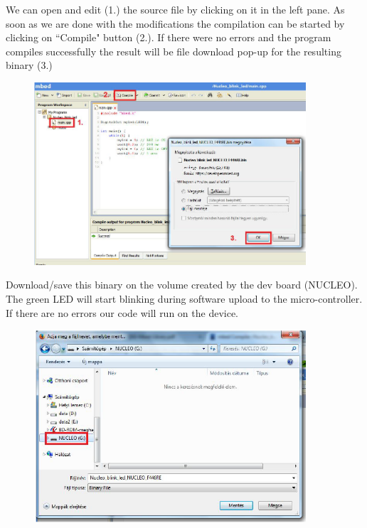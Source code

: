 \documentclass[a4paper]{article}
\begin{document}
We can open and edit (1.) the source file by clicking on it in the left pane. As soon as we are done with the
modifications the compilation can be started by clicking on ``Compile" button (2.). If there were no errors and the
program compiles successfully the result will be file download pop-up for the resulting binary (3.)

\begin{figure}[H]
    \centering
    \includegraphics[width=0.9\textwidth]{figures/mbed-compile.png}
\end{figure}

Download/save this binary on the volume created by the dev board (NUCLEO). The green LED will start blinking during
software upload to the micro-controller. If there are no errors our code will run on the device.

\begin{figure}[H]
    \centering
    \includegraphics[width=0.9\textwidth]{figures/mbed-nucleo-save.png}
\end{figure}
\end{document}
